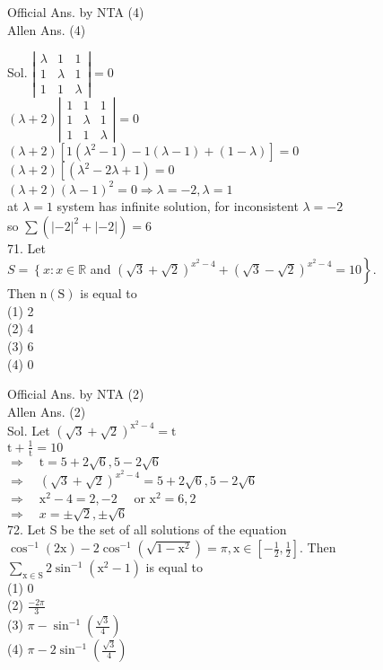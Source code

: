 \documentclass[10pt]{article}
\begin{document}
Official Ans. by NTA (4)\\
Allen Ans. (4)

Sol. \(\left|\begin{array}{lll}\lambda & 1 & 1 \\ 1 & \lambda & 1 \\ 1 & 1 & \lambda\end{array}\right|=0\)\\
\((\lambda+2)\left|\begin{array}{lll}1 & 1 & 1 \\ 1 & \lambda & 1 \\ 1 & 1 & \lambda\end{array}\right|=0\)\\
\((\lambda+2)\left[1\left(\lambda^{2}-1\right)-1(\lambda-1)+(1-\lambda)\right]=0\)\\
\((\lambda+2)\left[\left(\lambda^{2}-2 \lambda+1\right)=0\right.\)\\
\((\lambda+2)(\lambda-1)^{2}=0 \Rightarrow \lambda=-2, \lambda=1\)\\
at \(\lambda=1\) system has infinite solution, for inconsistent \(\lambda=-2\)\\
so \(\sum\left(|-2|^{2}+|-2|\right)=6\)\\
71. Let\\
\(S=\left\{x: x \in \mathbb{R}\right.\) and \(\left.(\sqrt{3}+\sqrt{2})^{x^{2}-4}+(\sqrt{3}-\sqrt{2})^{x^{2}-4}=10\right\}\).\\
Then \(\mathrm{n}(\mathrm{S})\) is equal to\\
(1) 2\\
(2) 4\\
(3) 6\\
(4) 0

Official Ans. by NTA (2)\\
Allen Ans. (2)\\
Sol. Let \((\sqrt{3}+\sqrt{2})^{\mathrm{x}^{2}-4}=\mathrm{t}\)\\
\(\mathrm{t}+\frac{1}{\mathrm{t}}=10\)\\
\(\Rightarrow \quad \mathrm{t}=5+2 \sqrt{6}, 5-2 \sqrt{6}\)\\
\(\Rightarrow \quad(\sqrt{3}+\sqrt{2})^{x^{2}-4}=5+2 \sqrt{6}, 5-2 \sqrt{6}\)\\
\(\Rightarrow \quad \mathrm{x}^{2}-4=2,-2 \quad\) or \(\mathrm{x}^{2}=6,2\)\\
\(\Rightarrow \quad x= \pm \sqrt{2}, \pm \sqrt{6}\)\\
72. Let S be the set of all solutions of the equation \(\cos ^{-1}(2 \mathrm{x})-2 \cos ^{-1}\left(\sqrt{1-\mathrm{x}^{2}}\right)=\pi, \mathrm{x} \in\left[-\frac{1}{2}, \frac{1}{2}\right]\). Then \(\sum_{\mathrm{x} \in \mathrm{S}} 2 \sin ^{-1}\left(\mathrm{x}^{2}-1\right)\) is equal to\\
(1) 0\\
(2) \(\frac{-2 \pi}{3}\)\\
(3) \(\pi-\sin ^{-1}\left(\frac{\sqrt{3}}{4}\right)\)\\
(4) \(\pi-2 \sin ^{-1}\left(\frac{\sqrt{3}}{4}\right)\)
\end{document}
